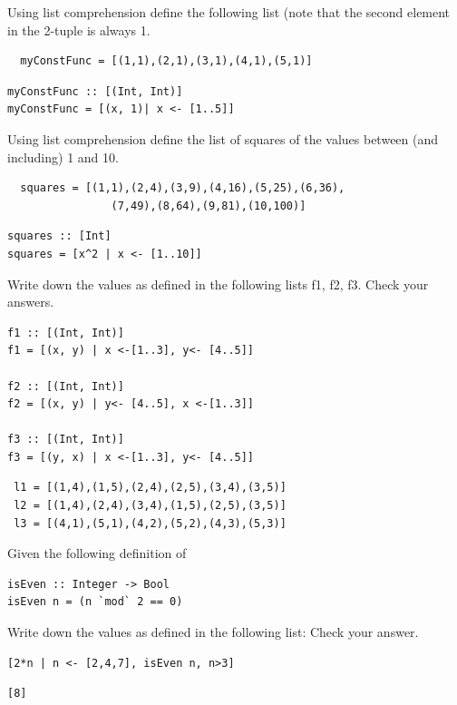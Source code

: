 \documentclass{article}
\begin{document}
%
\begin{Exercise}
Using list comprehension define the following list (note that the second element in the 2-tuple is always 1. 
\begin{lstlisting}
  myConstFunc = [(1,1),(2,1),(3,1),(4,1),(5,1)]
\end{lstlisting}
\end{Exercise}
\begin{Answer}
\begin{lstlisting}
myConstFunc :: [(Int, Int)]
myConstFunc = [(x, 1)| x <- [1..5]]
\end{lstlisting}
\end{Answer}
\begin{Exercise}
Using list comprehension define the list of squares of the values between (and including) 1 and 10.
\begin{lstlisting}
  squares = [(1,1),(2,4),(3,9),(4,16),(5,25),(6,36),
                (7,49),(8,64),(9,81),(10,100)]
\end{lstlisting}
\end{Exercise}
\begin{Answer}
\begin{lstlisting}
squares :: [Int]
squares = [x^2 | x <- [1..10]]
\end{lstlisting}
\end{Answer}


\begin{Exercise}
Write down the values as defined in the following lists f1, f2, f3. Check your answers. 
\begin{lstlisting}
f1 :: [(Int, Int)]
f1 = [(x, y) | x <-[1..3], y<- [4..5]]

f2 :: [(Int, Int)]
f2 = [(x, y) | y<- [4..5], x <-[1..3]]

f3 :: [(Int, Int)]
f3 = [(y, x) | x <-[1..3], y<- [4..5]]
\end{lstlisting}
\end{Exercise}
\begin{Answer}
\begin{lstlisting}
 l1 = [(1,4),(1,5),(2,4),(2,5),(3,4),(3,5)]
 l2 = [(1,4),(2,4),(3,4),(1,5),(2,5),(3,5)]
 l3 = [(4,1),(5,1),(4,2),(5,2),(4,3),(5,3)]
\end{lstlisting}
\end{Answer}
\begin{Exercise}
Given the following definition of 
\begin{lstlisting}
isEven :: Integer -> Bool
isEven n = (n `mod` 2 == 0)
\end{lstlisting}
Write down the values as defined in the following list: Check your answer. 
\begin{lstlisting}
[2*n | n <- [2,4,7], isEven n, n>3]
\end{lstlisting}
\end{Exercise}
\begin{Answer}
\begin{lstlisting}
[8]
\end{lstlisting}
\end{Answer}
\end{document}
